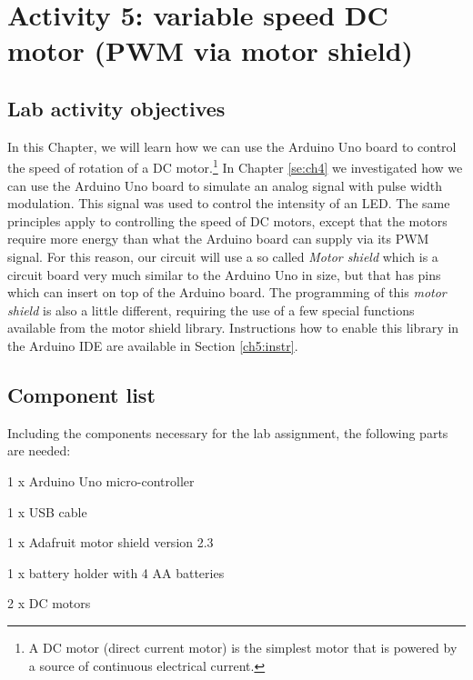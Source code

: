 \documentclass[12pt]{book}
\begin{document}

\chapter{Activity 5: variable speed DC motor (PWM via motor
  shield)} \label{ch:ex5} 

\section{Lab activity objectives}

In this Chapter, we will learn how we can use the Arduino Uno board to
control the speed of rotation of a DC motor.\footnote{A DC motor (direct
  current motor) is the simplest motor that is powered by a source of
  continuous electrical current.}
In Chapter \ref{se:ch4} we investigated how we can use the Arduino Uno
board to simulate an analog signal with pulse width modulation. This
signal was used to control the intensity of an LED. The same
principles apply to controlling the speed of DC motors, except that
the motors require more energy than what the Arduino board can supply
via its PWM signal. For this reason, our circuit will use a so called
\emph{Motor shield} which is a circuit board very much similar to the
Arduino Uno in size, but that has pins which can insert on top of the
Arduino board.
The programming of this \emph{motor shield} is also a little
different, requiring the use of a few special functions available from
the motor shield library. Instructions how to enable this library in
the Arduino IDE are available in Section \ref*{ch5:instr}.


\section{Component list}

Including the components necessary for the lab assignment, the
following parts are needed: 

\begin{compactitem}[--]
  \item 1 x Arduino Uno micro-controller
  \item 1 x USB cable
  \item 1 x Adafruit motor shield version 2.3
  \item 1 x battery holder with 4 AA batteries
  \item 2 x DC motors
\end{compactitem}
\end{document}
